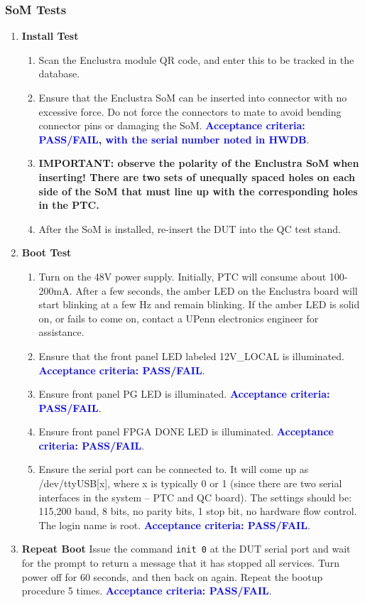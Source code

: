 \documentclass[a4paper,12pt]{article}
\begin{document}
\subsubsection{SoM Tests}
\label{section:som_tests}

    \begin{enumerate}
        \item \textbf{Install Test} 
            \begin{enumerate}
                \item Scan the Enclustra module QR code, and enter this to be tracked in the database. 
                \item Ensure that the Enclustra SoM can be inserted into connector with no excessive force. Do not force the connectors to mate to avoid bending connector pins or damaging the SoM. \textcolor{blue}{\textbf{Acceptance criteria: PASS/FAIL, with the serial number noted in HWDB}}.
                \item \textbf{IMPORTANT: observe the polarity of the Enclustra SoM when inserting! There are two sets of unequally spaced holes on each side of the SoM that must line up with the corresponding holes in the PTC.} 
                \item After the SoM is installed, re-insert the DUT into the QC test stand.
            \end{enumerate}
        \item \textbf{Boot Test}
            \begin{enumerate}
                \item Turn on the 48V power supply. Initially, PTC will consume about 100-200mA. After a few seconds, the amber LED on the Enclustra board will start blinking at a few Hz and remain blinking. If the amber LED is solid on, or fails to come on, contact a UPenn electronics engineer for assistance.
                \item Ensure that the front panel LED labeled 12V\_LOCAL is illuminated. \textcolor{blue}{\textbf{Acceptance criteria: PASS/FAIL}}.
                \item Ensure front panel PG LED is illuminated. \textcolor{blue}{\textbf{Acceptance criteria: PASS/FAIL}}.
                \item Ensure front panel FPGA DONE LED is illuminated. \textcolor{blue}{\textbf{Acceptance criteria: PASS/FAIL}}.
                \item Ensure the serial port can be connected to. It will come up as /dev/ttyUSB[x], where x is typically 0 or 1 (since there are two serial interfaces in the system -- PTC and QC board). The settings should be: 115,200 baud, 8 bits, no parity bits, 1 stop bit, no hardware flow control. The login name is root. \textcolor{blue}{\textbf{Acceptance criteria: PASS/FAIL}}.
            \end{enumerate}
        \item \textbf{Repeat Boot} Issue the command \texttt{init 0} at the DUT serial port and wait for the prompt to return a message that it has stopped all services. Turn power off for 60 seconds, and then back on again. Repeat the bootup procedure 5 times. \textcolor{blue}{\textbf{Acceptance criteria: PASS/FAIL}}.
    \end{enumerate}    
    
\end{document}
